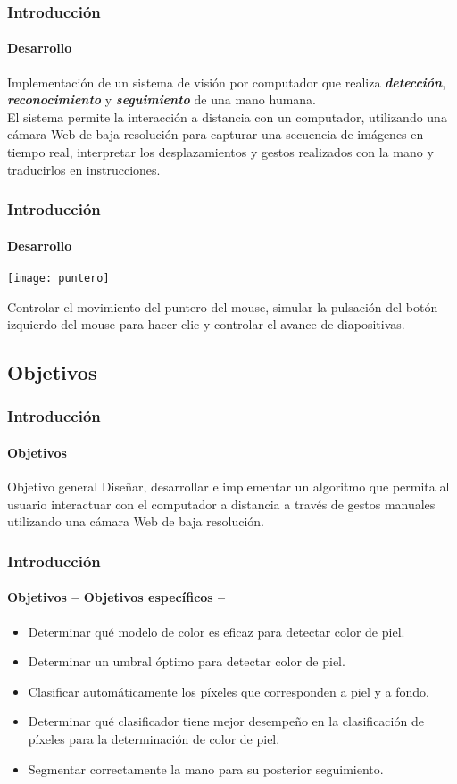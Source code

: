 \documentclass[xcolor=dvipsnames]{beamer}
\begin{document}
	\begin{frame}
		\transdissolve
		\frametitle{Introducción}
		\framesubtitle{Desarrollo}
		Implementación de un sistema de visión por computador que realiza \textbf{\textit{detección}}, \textbf{\textit{reconocimiento}} y \textbf{\textit{seguimiento}} de una mano humana.\\
		\vspace{.5cm}
		El sistema permite la interacción a distancia con un computador, utilizando una cámara Web de baja resolución para capturar una secuencia de imágenes en tiempo real, interpretar los desplazamientos y gestos realizados con la mano y traducirlos en instrucciones.
	\end{frame}

	\begin{frame}
		\transdissolve
		\frametitle{Introducción}
		\framesubtitle{Desarrollo}
		\begin{center}
			\texttt{[image: puntero]}
		\end{center}
		Controlar el movimiento del puntero del mouse, simular la pulsación del botón izquierdo del mouse para hacer clic y controlar el avance de diapositivas.
	\end{frame}

		\subsection{Objetivos}
		\begin{frame}
			\transdissolve
			\frametitle{Introducción}
			\framesubtitle{Objetivos}
			\begin{block}{Objetivo general}
			Diseñar, desarrollar e implementar un algoritmo que permita al usuario interactuar con el computador a distancia a través de gestos manuales utilizando una cámara Web de baja resolución.			
			\end{block}
		\end{frame}

		\begin{frame}
			\transdissolve
			\frametitle{Introducción}
			\framesubtitle{Objetivos -- Objetivos específicos --}
			\begin{itemize}
			\item Determinar qué modelo de color es eficaz para detectar color de piel.
			\item Determinar un umbral óptimo para detectar color de piel.
			\item Clasificar automáticamente los píxeles que corresponden a piel y a fondo.
			\item Determinar qué clasificador tiene mejor desempeño en la clasificación de píxeles para la determinación de color de piel.
			\item Segmentar correctamente la mano para su posterior seguimiento.
			\end{itemize}
		\end{frame}
\end{document}
